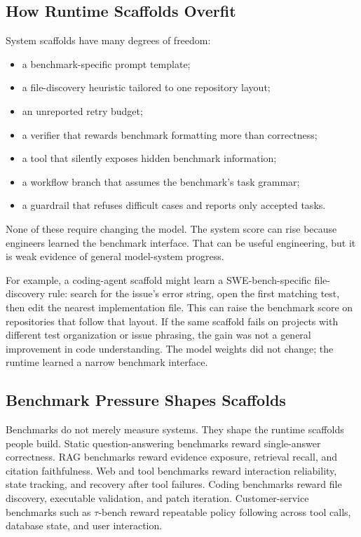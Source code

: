 \subsection{How Runtime Scaffolds Overfit}

System scaffolds have many degrees of freedom:

\begin{itemize}[nosep,leftmargin=1.5em]
  \item a benchmark-specific prompt template;
  \item a file-discovery heuristic tailored to one repository layout;
  \item an unreported retry budget;
  \item a verifier that rewards benchmark formatting more than correctness;
  \item a tool that silently exposes hidden benchmark information;
  \item a workflow branch that assumes the benchmark's task grammar;
  \item a guardrail that refuses difficult cases and reports only accepted tasks.
\end{itemize}

None of these require changing the model. The system score can rise because engineers learned the benchmark interface. That can be useful engineering, but it is weak evidence of general model-system progress.

For example, a coding-agent scaffold might learn a SWE-bench-specific file-discovery rule: search for the issue's error string, open the first matching test, then edit the nearest implementation file. This can raise the benchmark score on repositories that follow that layout. If the same scaffold fails on projects with different test organization or issue phrasing, the gain was not a general improvement in code understanding. The model weights did not change; the runtime learned a narrow benchmark interface.

\subsection{Benchmark Pressure Shapes Scaffolds}

Benchmarks do not merely measure systems. They shape the runtime scaffolds people build. Static question-answering benchmarks reward single-answer correctness. RAG benchmarks reward evidence exposure, retrieval recall, and citation faithfulness. Web and tool benchmarks reward interaction reliability, state tracking, and recovery after tool failures. Coding benchmarks reward file discovery, executable validation, and patch iteration. Customer-service benchmarks such as \(\tau\)-bench reward repeatable policy following across tool calls, database state, and user interaction.

